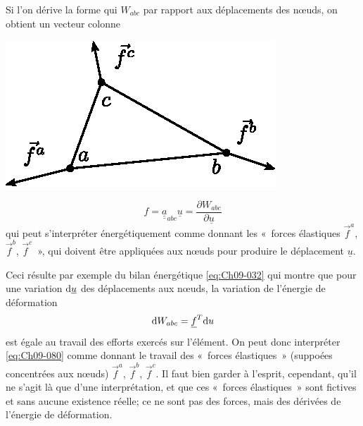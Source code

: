 Si l'on dérive la forme qui  $W_{abc}$ par rapport aux déplacements des nœuds, on obtient un vecteur colonne
\begin{multicols}{2}
    \begin{center}
        \includegraphics{../images/T1_Ch09-08}
    \end{center}
    \columnbreak
\begin{equation}
    f = \underline{\underline{a}}_{abc} \underline{u} = \frac{\partial W_{abc}}{\partial \underline{u}}
    \label{eq:Ch09-079}
\end{equation}
qui peut s'interpréter énergétiquement comme donnant les «~forces élastiques $\vec{f}^a$, $\vec{f}^b$, $\vec{f}^c$~», qui doivent être appliquées aux nœuds pour produire le déplacement $\underline{u}$.
\end{multicols}
Ceci résulte par exemple du bilan énergétique \eqref{eq:Ch09-032} qui montre que pour une variation $\mathrm{d} \underline{u}$ des déplacements aux nœuds, la variation de l'énergie de déformation 
\begin{equation}
    \mathrm{d} W_{abc} = \underline{f}^T \mathrm{d} u
    \label{eq:Ch09-080}
\end{equation}
est égale au travail des efforts exercés sur l'élément.
On peut donc interpréter \eqref{eq:Ch09-080} comme donnant le travail des «~forces élastiques~» (suppoées concentrées aux nœuds) $\vec{f}^a$, $\vec{f}^b$, $\vec{f}^c$.
Il faut bien garder à l'esprit, cependant, qu'il ne s'agit là que d'une interprétation, et que ces «~forces élastiques~» sont fictives et sans aucune existence réelle; ce ne sont pas 
des forces, mais des dérivées de l'énergie de déformation. 

